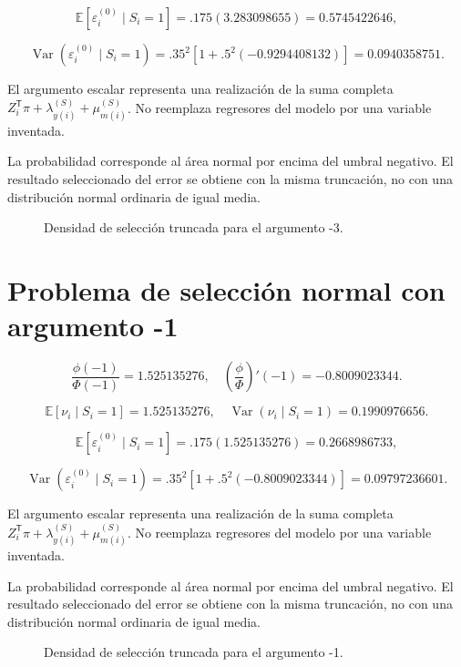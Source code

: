 \documentclass[11pt,a4paper]{article}
\newcommand{\E}{\mathbb E}
\DeclareMathOperator{\Var}{Var}
\begin{document}
\[
\E[\varepsilon_i^{(0)}\mid S_i=1]=.175(3.283098655)=0.5745422646,
\]

\[
\Var(\varepsilon_i^{(0)}\mid S_i=1)=.35^2[1+.5^2(-0.9294408132)]=0.0940358751.
\]

El argumento escalar representa una realización de la suma completa $Z_i^{\mathsf T}\pi+\lambda_{y(i)}^{(S)}+\mu_{m(i)}^{(S)}$. No reemplaza regresores del modelo por una variable inventada.

La probabilidad corresponde al área normal por encima del umbral negativo. El resultado seleccionado del error se obtiene con la misma truncación, no con una distribución normal ordinaria de igual media.
\begin{figure}[H]\centering{}\caption{Densidad de selección truncada para el argumento -3.}\end{figure}

\clearpage
\section{Problema de selección normal con argumento -1}

\[
\frac{\phi(-1)}{\Phi(-1)}=1.525135276,\quad
\left(\frac{\phi}{\Phi}\right)'(-1)=-0.8009023344.
\]

\[
\E[\nu_i\mid S_i=1]=1.525135276,\quad
\Var(\nu_i\mid S_i=1)=0.1990976656.
\]

\[
\E[\varepsilon_i^{(0)}\mid S_i=1]=.175(1.525135276)=0.2668986733,
\]

\[
\Var(\varepsilon_i^{(0)}\mid S_i=1)=.35^2[1+.5^2(-0.8009023344)]=0.09797236601.
\]

El argumento escalar representa una realización de la suma completa $Z_i^{\mathsf T}\pi+\lambda_{y(i)}^{(S)}+\mu_{m(i)}^{(S)}$. No reemplaza regresores del modelo por una variable inventada.

La probabilidad corresponde al área normal por encima del umbral negativo. El resultado seleccionado del error se obtiene con la misma truncación, no con una distribución normal ordinaria de igual media.
\begin{figure}[H]\centering{}\caption{Densidad de selección truncada para el argumento -1.}\end{figure}
\end{document}
